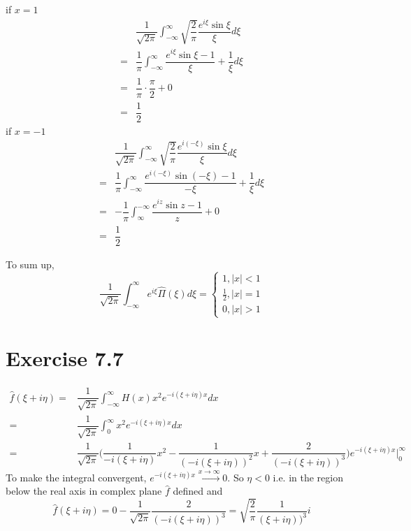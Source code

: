\documentclass[a4paper,12pt,titlepage]{article}
\begin{document}
if $x=1$
\begin{align*}
&\dfrac{1}{\sqrt{2\pi}}\int_{-\infty}^{\infty}\sqrt{\dfrac{2}{\pi}}\dfrac{e^{i\xi}\sin\xi}{\xi}d\xi\\
=&\dfrac{1}{\pi}\int_{-\infty}^{\infty}\dfrac{e^{i\xi}\sin\xi-1}{\xi}+\dfrac{1}{\xi}d\xi\\
=&\dfrac{1}{\pi}\cdot\dfrac{\pi}{2}+0\\
=&\dfrac{1}{2}
\end{align*}
if $x=-1$
\begin{align*}
&\dfrac{1}{\sqrt{2\pi}}\int_{-\infty}^{\infty}\sqrt{\dfrac{2}{\pi}}\dfrac{e^{i(-\xi)}\sin\xi}{\xi}d\xi\\
=&\dfrac{1}{\pi}\int_{-\infty}^{\infty}\dfrac{e^{i(-\xi)}\sin(-\xi)-1}{-\xi}+\dfrac{1}{\xi}d\xi\\
=&-\dfrac{1}{\pi}\int_{\infty}^{-\infty}\dfrac{e^{iz}\sin z-1}{z}+0\\
=&\dfrac{1}{2}
\end{align*}

To sum up,
$$\dfrac{1}{\sqrt{2\pi}}\int_{-\infty}^{\infty}e^{i\xi}\widehat{\Pi}(\xi)d\xi=\left\{
\begin{aligned}
1,|x|<1\\
\frac{1}{2},|x|=1\\
0,|x|>1
\end{aligned}
\right.$$


\section*{Exercise 7.7}

\begin{align*}
\widehat{f}(\xi+i\eta)=&\dfrac{1}{\sqrt{2\pi}}\int_{-\infty}^{\infty}H(x)x^2e^{-i(\xi+i\eta)x}dx\\
=&\dfrac{1}{\sqrt{2\pi}}\int_{0}^{\infty}x^2e^{-i(\xi+i\eta)x}dx\\
=&\dfrac{1}{\sqrt{2\pi}}\Big(\dfrac{1}{-i(\xi+i\eta)}x^2-\dfrac{1}{(-i(\xi+i\eta))^2}x+\dfrac{2}{(-i(\xi+i\eta))^3}\Big)e^{-i(\xi+i\eta)x}|_{0}^{\infty}
\end{align*}
To make the integral convergent, $e^{-i(\xi+i\eta)x}\xrightarrow{x\rightarrow\infty}0$. So $\eta<0$ i.e. in the region below the real axis in complex plane $\widehat{f}$ defined and
$$\widehat{f}(\xi+i\eta)=0-\dfrac{1}{\sqrt{2\pi}}\dfrac{2}{(-i(\xi+i\eta))^3}=\sqrt{\dfrac{2}{\pi}}\dfrac{1}{(\xi+i\eta))^3}i$$
\end{document}
